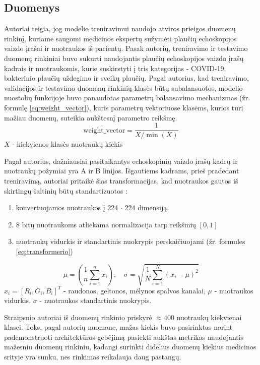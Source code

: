 \documentclass[fleqn]{VUMIFKompMagistrinis}
\begin{document}
\subsection{Duomenys}
Autoriai teigia, jog modelio treniravimui naudojo atviros prieigos duomenų rinkinį, kuriame saugomi medicinos ekspertų sužymėti plaučių echoskopijos vaizdo įrašai ir nuotraukos iš pacientų\cite{PAY21}. Pasak autorių, treniravimo ir testavimo duomenų rinkiniai buvo sukurti naudojantis plaučių echoskopijos vaizdo įrašų kadrais ir nuotraukomis, kurie suskirstyti į tris kategorijas - COVID-19, bakterinio plaučių uždegimo ir sveikų plaučių. Pagal autorius, kad treniravimo, validacijos ir testavimo duomenų rinkinių klasės būtų subalansuotos, modelio nuostolių funkcijoje buvo panaudotas parametrų balansavimo mechanizmas (žr. formulę \ref{eq:weight_vector}), kuris parametrų vektoriuose klasėms, kurios turi mažiau duomenų, suteikia aukštesnį parametro reikšmę.\cite{PAY21}
\begin{equation}\label{eq:weight_vector}
    \text{weight\_vector} = \frac{1}{X/\min(X)}
\end{equation}
\( X \) - kiekvienos klasės nuotraukų kiekis
\par
Pagal autorius, dažniausiai pasitaikantys echoskopinių vaizdo įrašų kadrų ir nuotraukų požymiai yra A ir B linijos. Išgautiems kadrams, prieš pradedant treniravimą, autoriai pritaikė šias transformacijas, kad nuotraukos gautos iš skirtingų šaltinių būtų standartizuotos \cite{PAY21}:
\begin{enumerate}
    \item konvertuojamos nuotraukos į 224 \(\cdot\) 224 dimensiją.
    \item 8 bitų nuotraukoms atliekama normalizacija tarp reikšmių \([0,1]\) 
    \item nuotraukų vidurkis ir standartinis nuokrypis perskaičiuojami (žr. formules \ref{eq:transformerio}) 
\end{enumerate}
\begin{equation}\label{eq:transformerio}
\mu = \left( \frac{1}{n} \sum_{i=1}^{n} x_i \right), \quad
\sigma = \sqrt{\frac{1}{N} \sum_{i=1}^{N} (x_i - \mu)^2}
\end{equation}
\( x_i = [R_i, G_i, B_i]^T \) - raudonos, geltonos, mėlynos spalvos kanalai, \(\mu\) - nuotraukos vidurkis, \(\sigma\) - nuotraukos standartinis nuokrypis. 
\par
Straipsnio autoriai iš duomenų rinkinio priskyrė \(\approx400\) nuotraukų kiekvienai klasei. Toks, pagal autorių nuomone, mažas kiekis buvo pasirinktas norint pademonstruoti architektūros gebėjimą pasiekti aukštas metrikas naudojantis mažesniu duomenų rinkiniu, kadangi surinkti didelius duomenų kiekius medicinos srityje yra sunku, nes rinkimas reikalauja daug pastangų.\cite{PAY21}
\end{document}
